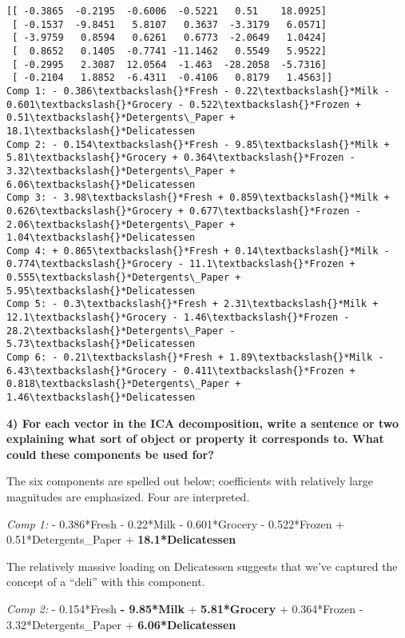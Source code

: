 \documentclass{article}
\begin{document}
    \begin{Verbatim}[commandchars=\\\{\}]
[[ -0.3865  -0.2195  -0.6006  -0.5221   0.51    18.0925]
 [ -0.1537  -9.8451   5.8107   0.3637  -3.3179   6.0571]
 [ -3.9759   0.8594   0.6261   0.6773  -2.0649   1.0424]
 [  0.8652   0.1405  -0.7741 -11.1462   0.5549   5.9522]
 [ -0.2995   2.3087  12.0564  -1.463  -28.2058  -5.7316]
 [ -0.2104   1.8852  -6.4311  -0.4106   0.8179   1.4563]]
Comp 1: - 0.386\textbackslash{}*Fresh - 0.22\textbackslash{}*Milk - 0.601\textbackslash{}*Grocery - 0.522\textbackslash{}*Frozen + 0.51\textbackslash{}*Detergents\_Paper + 18.1\textbackslash{}*Delicatessen
Comp 2: - 0.154\textbackslash{}*Fresh - 9.85\textbackslash{}*Milk + 5.81\textbackslash{}*Grocery + 0.364\textbackslash{}*Frozen - 3.32\textbackslash{}*Detergents\_Paper + 6.06\textbackslash{}*Delicatessen
Comp 3: - 3.98\textbackslash{}*Fresh + 0.859\textbackslash{}*Milk + 0.626\textbackslash{}*Grocery + 0.677\textbackslash{}*Frozen - 2.06\textbackslash{}*Detergents\_Paper + 1.04\textbackslash{}*Delicatessen
Comp 4: + 0.865\textbackslash{}*Fresh + 0.14\textbackslash{}*Milk - 0.774\textbackslash{}*Grocery - 11.1\textbackslash{}*Frozen + 0.555\textbackslash{}*Detergents\_Paper + 5.95\textbackslash{}*Delicatessen
Comp 5: - 0.3\textbackslash{}*Fresh + 2.31\textbackslash{}*Milk + 12.1\textbackslash{}*Grocery - 1.46\textbackslash{}*Frozen - 28.2\textbackslash{}*Detergents\_Paper - 5.73\textbackslash{}*Delicatessen
Comp 6: - 0.21\textbackslash{}*Fresh + 1.89\textbackslash{}*Milk - 6.43\textbackslash{}*Grocery - 0.411\textbackslash{}*Frozen + 0.818\textbackslash{}*Detergents\_Paper + 1.46\textbackslash{}*Delicatessen
    \end{Verbatim}

    \textbf{4) For each vector in the ICA decomposition, write a sentence or
two explaining what sort of object or property it corresponds to. What
could these components be used for?}

    The six components are spelled out below; coefficients with relatively
large magnitudes are emphasized. Four are interpreted.

\emph{Comp 1:} - 0.386*Fresh - 0.22*Milk - 0.601*Grocery - 0.522*Frozen
+ 0.51*Detergents\_Paper + \textbf{18.1*Delicatessen}

The relatively massive loading on Delicatessen suggests that we've
captured the concept of a ``deli'' with this component.

\emph{Comp 2:} - 0.154*Fresh \textbf{- 9.85*Milk} +
\textbf{5.81*Grocery} + 0.364*Frozen - 3.32*Detergents\_Paper +
\textbf{6.06*Delicatessen}
\end{document}
